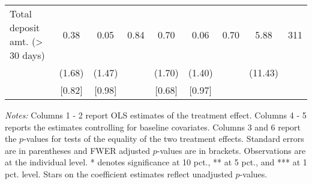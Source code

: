 \begin{table}[htbp]
{\begin{threeparttable}
\begin{tabular}{l*{8}{c}}
Total deposit amt. (> 30 days)&     0.38&     0.05&     0.84&     0.70&     0.06&     0.70&     5.88&      311\\
          &   (1.68)&   (1.47)&         &   (1.70)&   (1.40)&         &  (11.43)&         \\
          &   [0.82]&   [0.98]&         &   [0.68]&   [0.97]&         &         &         \\
\bottomrule \end{tabular} \begin{tablenotes}[flushleft] \footnotesize \item \emph{Notes:} Columns 1 - 2 report OLS estimates of the treatment effect. Columns 4 - 5 reports the estimates controlling for baseline covariates. Columns 3 and 6 report the \(p\)-values for tests of the equality of the two treatment effects. Standard errors are in parentheses and FWER adjusted \(p\)-values are in brackets. Observations are at the individual level. * denotes significance at 10 pct., ** at 5 pct., and *** at 1 pct. level. Stars on the coefficient estimates reflect unadjusted \(p\)-values. \end{tablenotes} \end{threeparttable} } \end{table}

